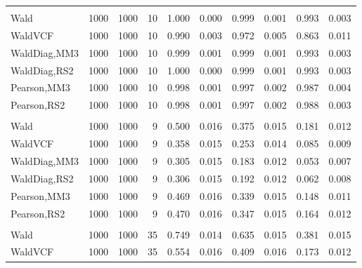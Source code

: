 \documentclass[
]{article}
\begin{document}
\begin{table}[H]
{\begin{tabular}[t]{lrrrrrrlrr}
\addlinespace[0.3em]
\multicolumn{10}{l}{\textbf{1F 15V}}\\
\hspace{1em}Wald & 1000 & 1000 & 10 & 1.000 & 0.000 & 0.999 & 0.001 & 0.993 & 0.003\\
\hspace{1em}WaldVCF & 1000 & 1000 & 10 & 0.990 & 0.003 & 0.972 & 0.005 & 0.863 & 0.011\\
\hspace{1em}WaldDiag,MM3 & 1000 & 1000 & 10 & 0.999 & 0.001 & 0.999 & 0.001 & 0.993 & 0.003\\
\hspace{1em}WaldDiag,RS2 & 1000 & 1000 & 10 & 1.000 & 0.000 & 0.999 & 0.001 & 0.993 & 0.003\\
\hspace{1em}Pearson,MM3 & 1000 & 1000 & 10 & 0.998 & 0.001 & 0.997 & 0.002 & 0.987 & 0.004\\
\hspace{1em}Pearson,RS2 & 1000 & 1000 & 10 & 0.998 & 0.001 & 0.997 & 0.002 & 0.988 & 0.003\\
\addlinespace[0.3em]
\multicolumn{10}{l}{\textbf{2F 10V}}\\
\hspace{1em}Wald & 1000 & 1000 & 9 & 0.500 & 0.016 & 0.375 & 0.015 & 0.181 & 0.012\\
\hspace{1em}WaldVCF & 1000 & 1000 & 9 & 0.358 & 0.015 & 0.253 & 0.014 & 0.085 & 0.009\\
\hspace{1em}WaldDiag,MM3 & 1000 & 1000 & 9 & 0.305 & 0.015 & 0.183 & 0.012 & 0.053 & 0.007\\
\hspace{1em}WaldDiag,RS2 & 1000 & 1000 & 9 & 0.306 & 0.015 & 0.192 & 0.012 & 0.062 & 0.008\\
\hspace{1em}Pearson,MM3 & 1000 & 1000 & 9 & 0.469 & 0.016 & 0.339 & 0.015 & 0.148 & 0.011\\
\hspace{1em}Pearson,RS2 & 1000 & 1000 & 9 & 0.470 & 0.016 & 0.347 & 0.015 & 0.164 & 0.012\\
\addlinespace[0.3em]
\multicolumn{10}{l}{\textbf{3F 15V}}\\
\hspace{1em}Wald & 1000 & 1000 & 35 & 0.749 & 0.014 & 0.635 & 0.015 & 0.381 & 0.015\\
\hspace{1em}WaldVCF & 1000 & 1000 & 35 & 0.554 & 0.016 & 0.409 & 0.016 & 0.173 & 0.012\\

\end{tabular}}
\end{table}
\end{document}
